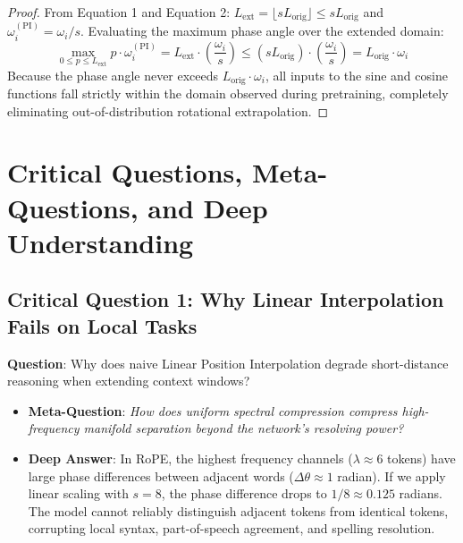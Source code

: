\documentclass[11pt,a4paper]{article}
\theoremstyle{definition}
\begin{document}
\begin{proof}
From Equation 1 and Equation 2: $L_{\text{ext}} = \lfloor s L_{\text{orig}} \rfloor \le s L_{\text{orig}}$ and $\omega_i^{(\text{PI})} = \omega_i / s$.
Evaluating the maximum phase angle over the extended domain:
{\boldmath
\begin{equation}
\max_{0 \le p \le L_{\text{ext}}} p \cdot \omega_i^{(\text{PI})} = L_{\text{ext}} \cdot \left(\frac{\omega_i}{s}\right) \le (s L_{\text{orig}}) \cdot \left(\frac{\omega_i}{s}\right) = L_{\text{orig}} \cdot \omega_i
\end{equation}
}
Because the phase angle never exceeds $L_{\text{orig}} \cdot \omega_i$, all inputs to the sine and cosine functions fall strictly within the domain observed during pretraining, completely eliminating out-of-distribution rotational extrapolation.
\end{proof}

\section{Critical Questions, Meta-Questions, and Deep Understanding}

\subsection{\textbf{Critical Question 1: Why Linear Interpolation Fails on Local Tasks}}
\textbf{Question}: Why does naive Linear Position Interpolation degrade short-distance reasoning when extending context windows?
\begin{itemize}
    \item \textbf{Meta-Question}: \emph{How does uniform spectral compression compress high-frequency manifold separation beyond the network's resolving power?}
    \item \textbf{Deep Answer}: In RoPE, the highest frequency channels ($\lambda \approx 6$ tokens) have large phase differences between adjacent words ($\Delta \theta \approx 1$ radian). If we apply linear scaling with $s = 8$, the phase difference drops to $1/8 \approx 0.125$ radians. The model cannot reliably distinguish adjacent tokens from identical tokens, corrupting local syntax, part-of-speech agreement, and spelling resolution.
\end{itemize}
\end{document}
